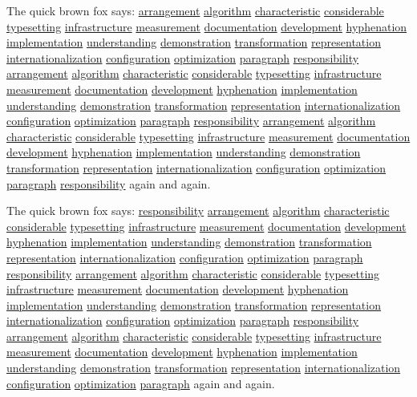 \documentclass{article}
\begin{document}
The quick brown fox says: \underline{arrangement} \underline{algorithm} \underline{characteristic} \underline{considerable} \underline{typesetting} \underline{infrastructure} \underline{measurement} \underline{documentation} \underline{development} \underline{hyphenation} \underline{implementation} \underline{understanding} \underline{demonstration} \underline{transformation} \underline{representation} \underline{internationalization} \underline{configuration} \underline{optimization} \underline{paragraph} \underline{responsibility} \underline{arrangement} \underline{algorithm} \underline{characteristic} \underline{considerable} \underline{typesetting} \underline{infrastructure} \underline{measurement} \underline{documentation} \underline{development} \underline{hyphenation} \underline{implementation} \underline{understanding} \underline{demonstration} \underline{transformation} \underline{representation} \underline{internationalization} \underline{configuration} \underline{optimization} \underline{paragraph} \underline{responsibility} \underline{arrangement} \underline{algorithm} \underline{characteristic} \underline{considerable} \underline{typesetting} \underline{infrastructure} \underline{measurement} \underline{documentation} \underline{development} \underline{hyphenation} \underline{implementation} \underline{understanding} \underline{demonstration} \underline{transformation} \underline{representation} \underline{internationalization} \underline{configuration} \underline{optimization} \underline{paragraph} \underline{responsibility} again and again.

The quick brown fox says: \underline{responsibility} \underline{arrangement} \underline{algorithm} \underline{characteristic} \underline{considerable} \underline{typesetting} \underline{infrastructure} \underline{measurement} \underline{documentation} \underline{development} \underline{hyphenation} \underline{implementation} \underline{understanding} \underline{demonstration} \underline{transformation} \underline{representation} \underline{internationalization} \underline{configuration} \underline{optimization} \underline{paragraph} \underline{responsibility} \underline{arrangement} \underline{algorithm} \underline{characteristic} \underline{considerable} \underline{typesetting} \underline{infrastructure} \underline{measurement} \underline{documentation} \underline{development} \underline{hyphenation} \underline{implementation} \underline{understanding} \underline{demonstration} \underline{transformation} \underline{representation} \underline{internationalization} \underline{configuration} \underline{optimization} \underline{paragraph} \underline{responsibility} \underline{arrangement} \underline{algorithm} \underline{characteristic} \underline{considerable} \underline{typesetting} \underline{infrastructure} \underline{measurement} \underline{documentation} \underline{development} \underline{hyphenation} \underline{implementation} \underline{understanding} \underline{demonstration} \underline{transformation} \underline{representation} \underline{internationalization} \underline{configuration} \underline{optimization} \underline{paragraph} again and again.
\end{document}
